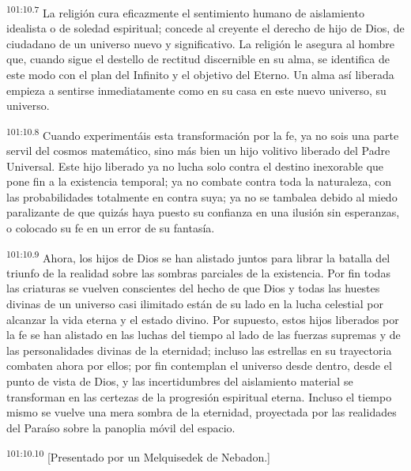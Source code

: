 \par
\textsuperscript{101:10.7} La religión cura eficazmente el sentimiento humano de aislamiento idealista o de soledad espiritual; concede al creyente el derecho de hijo de Dios, de ciudadano de un universo nuevo y significativo. La religión le asegura al hombre que, cuando sigue el destello de rectitud discernible en su alma, se identifica de este modo con el plan del Infinito y el objetivo del Eterno. Un alma así liberada empieza a sentirse inmediatamente como en su casa en este nuevo universo, su universo.

\par
\textsuperscript{101:10.8} Cuando experimentáis esta transformación por la fe, ya no sois una parte servil del cosmos matemático, sino más bien un hijo volitivo liberado del Padre Universal. Este hijo liberado ya no lucha solo contra el destino inexorable que pone fin a la existencia temporal; ya no combate contra toda la naturaleza, con las probabilidades totalmente en contra suya; ya no se tambalea debido al miedo paralizante de que quizás haya puesto su confianza en una ilusión sin esperanzas, o colocado su fe en un error de su fantasía.

\par
\textsuperscript{101:10.9} Ahora, los hijos de Dios se han alistado juntos para librar la batalla del triunfo de la realidad sobre las sombras parciales de la existencia. Por fin todas las criaturas se vuelven conscientes del hecho de que Dios y todas las huestes divinas de un universo casi ilimitado están de su lado en la lucha celestial por alcanzar la vida eterna y el estado divino. Por supuesto, estos hijos liberados por la fe se han alistado en las luchas del tiempo al lado de las fuerzas supremas y de las personalidades divinas de la eternidad; incluso las estrellas en su trayectoria combaten ahora por ellos; por fin contemplan el universo desde dentro, desde el punto de vista de Dios, y las incertidumbres del aislamiento material se transforman en las certezas de la progresión espiritual eterna. Incluso el tiempo mismo se vuelve una mera sombra de la eternidad, proyectada por las realidades del Paraíso sobre la panoplia móvil del espacio.

\par
\textsuperscript{101:10.10} [Presentado por un Melquisedek de Nebadon.]